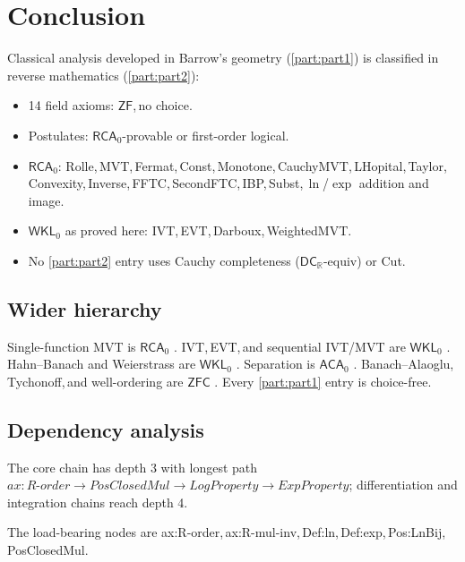 \documentclass[11pt,reqno]{amsart}
\providecommand{\R}{\mathbb{R}}
\newcommand{\comma}{,\,\allowbreak}
\theoremstyle{redplain}
\begin{document}
\section{Conclusion}
\label{sec:conclusion}
\begingroup\sloppy

\noindent Classical analysis developed in Barrow's geometry (\autoref{part:part1}) is classified in reverse mathematics (\autoref{part:part2}):
\begin{itemize}
	\item 14 field axioms: $\textsf{ZF}$\comma no choice.
	\item Postulates: $\textsf{RCA}_0$-provable or first-order logical.
	\item $\textsf{RCA}_0$: Rolle\comma MVT\comma Fermat\comma Const\comma Monotone\comma CauchyMVT\comma LHopital\comma Taylor\comma Convexity\comma Inverse\comma FFTC\comma SecondFTC\comma IBP\comma Subst\comma $\ln$/$\exp$ addition and image.
	\item $\textsf{WKL}_0$ as proved here: IVT\comma EVT\comma Darboux\comma WeightedMVT.
	\item No \autoref{part:part2} entry uses Cauchy completeness ($\textsf{DC}_\R$-equiv) or Cut.
\end{itemize}

\endgroup
\subsection{Wider hierarchy}
Single-function MVT is $\textsf{RCA}_0$ \cite{HardinVelleman2001}. 
IVT\comma EVT\comma and sequential IVT/MVT are $\textsf{WKL}_0$ \cite{Simpson2009,Sanders2020}. 
Hahn--Banach and Weierstrass are $\textsf{WKL}_0$ \cite{Simpson2009}. 
Separation is $\textsf{ACA}_0$ \cite{Humphreys2015}. 
Banach--Alaoglu\comma Tychonoff\comma and well-ordering are $\textsf{ZFC}$ \cite{Alaoglu1940,Kelley1950,Jech1973}. 
Every \autoref{part:part1} entry is choice-free.

\subsection{Dependency analysis }
\begingroup\sloppy
The core chain has depth 3 with longest path
$ax{:}R\text{-}order\to\allowbreak PosClosedMul\to\allowbreak LogProperty\to\allowbreak ExpProperty$;
differentiation and integration chains reach depth 4.

The load-bearing nodes are \textsf{ax:R-order}\comma \textsf{ax:R-mul-inv}\comma \textsf{Def:ln}\comma \textsf{Def:exp}\comma \textsf{Pos:LnBij}\comma \textsf{PosClosedMul}.
\end{document}
